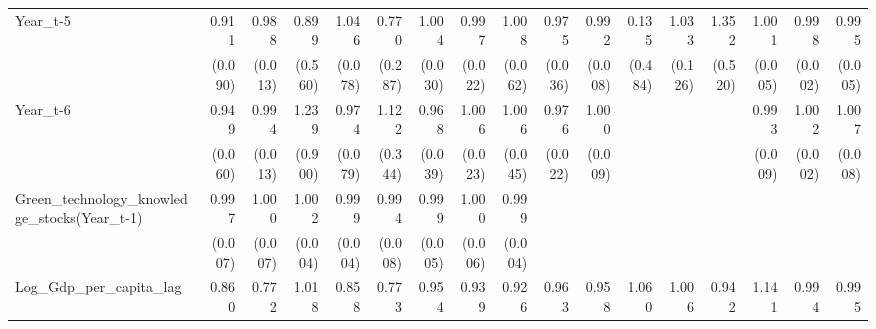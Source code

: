 \begin{table}[htbp]
\begin{tabular}{l*{16}{D{.}{.}{-1}}}
Year\_t-5            &       0.911         &       0.988         &       0.899         &       1.046         &       0.770         &       1.004         &       0.997         &       1.008         &       0.975         &       0.992         &       0.135         &       1.033         &       1.352         &       1.001         &       0.998         &       0.995         \\
                    &     (0.090)         &     (0.013)         &     (0.560)         &     (0.078)         &     (0.287)         &     (0.030)         &     (0.022)         &     (0.062)         &     (0.036)         &     (0.008)         &     (0.484)         &     (0.126)         &     (0.520)         &     (0.005)         &     (0.002)         &     (0.005)         \\
Year\_t-6            &       0.949         &       0.994         &       1.239         &       0.974         &       1.122         &       0.968         &       1.006         &       1.006         &       0.976         &       1.000         &                     &                     &                     &       0.993         &       1.002         &       1.007         \\
                    &     (0.060)         &     (0.013)         &     (0.900)         &     (0.079)         &     (0.344)         &     (0.039)         &     (0.023)         &     (0.045)         &     (0.022)         &     (0.009)         &                     &                     &                     &     (0.009)         &     (0.002)         &     (0.008)         \\
Green\_technology\_knowledge\_stocks(Year\_t-1)&       0.997         &       1.000         &       1.002         &       0.999         &       0.994         &       0.999         &       1.000         &       0.999         &                     &                     &                     &                     &                     &                     &                     &                     \\
                    &     (0.007)         &     (0.007)         &     (0.004)         &     (0.004)         &     (0.008)         &     (0.005)         &     (0.006)         &     (0.004)         &                     &                     &                     &                     &                     &                     &                     &                     \\
Log\_Gdp\_per\_capita\_lag&       0.860         &       0.772         &       1.018         &       0.858         &       0.773         &       0.954         &       0.939         &       0.926         &       0.963         &       0.958         &       1.060         &       1.006         &       0.942         &       1.141         &       0.994         &       0.995         \\

\end{tabular}
\end{table}
